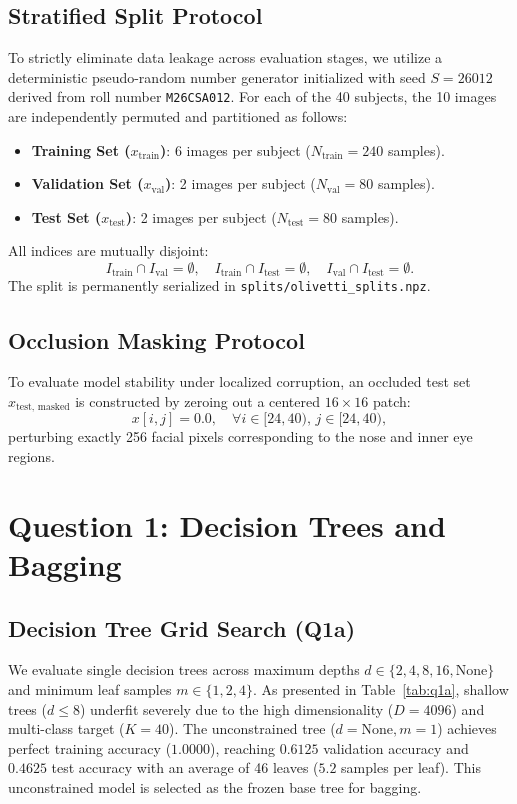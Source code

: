 \documentclass[10pt,twocolumn,letterpaper]{article}
\begin{document}
\subsection{Stratified Split Protocol}
To strictly eliminate data leakage across evaluation stages, we utilize a deterministic pseudo-random number generator initialized with seed $S = 26012$ derived from roll number \texttt{M26CSA012}. For each of the 40 subjects, the 10 images are independently permuted and partitioned as follows:
\begin{itemize}
    \item \textbf{Training Set ($x_{\text{train}}$)}: 6 images per subject ($N_{\text{train}} = 240$ samples).
    \item \textbf{Validation Set ($x_{\text{val}}$)}: 2 images per subject ($N_{\text{val}} = 80$ samples).
    \item \textbf{Test Set ($x_{\text{test}}$)}: 2 images per subject ($N_{\text{test}} = 80$ samples).
\end{itemize}
All indices are mutually disjoint:
\begin{equation}
    I_{\text{train}} \cap I_{\text{val}} = \emptyset, \quad I_{\text{train}} \cap I_{\text{test}} = \emptyset, \quad I_{\text{val}} \cap I_{\text{test}} = \emptyset.
\end{equation}
The split is permanently serialized in \texttt{splits/olivetti\_splits.npz}.

\subsection{Occlusion Masking Protocol}
To evaluate model stability under localized corruption, an occluded test set $x_{\text{test, masked}}$ is constructed by zeroing out a centered $16 \times 16$ patch:
\begin{equation}
    x[i, j] = 0.0, \quad \forall i \in [24, 40), \, j \in [24, 40),
\end{equation}
perturbing exactly 256 facial pixels corresponding to the nose and inner eye regions.

\section{Question 1: Decision Trees and Bagging}
\label{sec:q1}

\subsection{Decision Tree Grid Search (Q1a)}
We evaluate single decision trees across maximum depths $d \in \{2, 4, 8, 16, \text{None}\}$ and minimum leaf samples $m \in \{1, 2, 4\}$. As presented in Table~\ref{tab:q1a}, shallow trees ($d \le 8$) underfit severely due to the high dimensionality ($D=4096$) and multi-class target ($K=40$). The unconstrained tree ($d=\text{None}, m=1$) achieves perfect training accuracy ($1.0000$), reaching $0.6125$ validation accuracy and $0.4625$ test accuracy with an average of 46 leaves ($5.2$ samples per leaf). This unconstrained model is selected as the frozen base tree for bagging.
\end{document}
